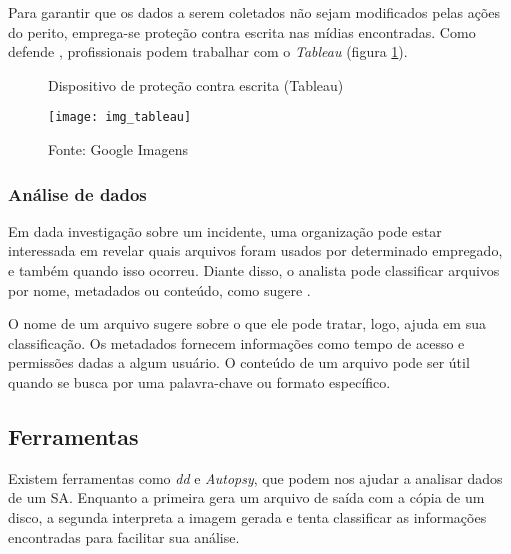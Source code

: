     \vspace{4mm}
    
    \hspace{1cm}
    Para garantir que os dados a serem coletados  não sejam modificados pelas ações do perito, emprega-se proteção contra escrita nas mídias encontradas. Como defende , profissionais podem trabalhar com o \textit{Tableau} (figura \ref{tableau_img}).
    
    \begin{figure}[H]
    	\centering
    	\caption{Dispositivo de proteção contra escrita (Tableau)}
    	\texttt{[image: img\_tableau]}
    	\caption*{Fonte: Google Imagens}
    	\label{tableau_img}
    \end{figure}
    
    \subsubsection{Análise de dados}
    
    \hspace{1cm}
    Em dada investigação sobre um incidente, uma organização pode estar interessada em revelar quais arquivos foram usados por determinado empregado, e também quando isso ocorreu. Diante disso, o analista pode classificar arquivos por nome, metadados ou conteúdo, como sugere .
    
    \vspace{4mm}
    
    \hspace{1cm}
    O nome de um arquivo sugere sobre o que ele pode tratar, logo, ajuda em sua classificação. Os metadados fornecem informações como tempo de acesso e permissões dadas a algum usuário. O conteúdo de um arquivo pode ser útil quando se busca por uma palavra-chave ou formato específico.
    
    \subsection{Ferramentas} \label{cap2_ferramentas}
    
    \hspace{1cm}
    Existem ferramentas como \textit{dd} e \textit{Autopsy}, que podem nos ajudar a analisar dados de um SA. Enquanto a primeira gera um arquivo de saída com a cópia de um disco, a segunda interpreta a imagem gerada e tenta classificar as informações encontradas para facilitar sua análise.
    
